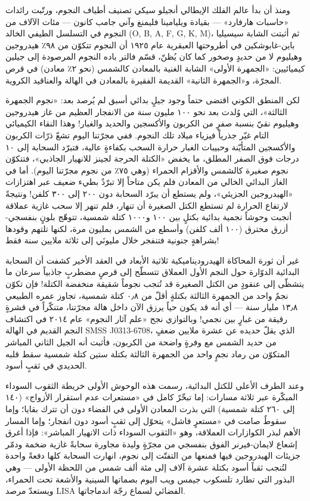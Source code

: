 \documentclass[12pt,a4paper,openany]{book}
\begin{document}
ومنذ أن بدأ عالم الفلك الإيطالي أنجيلو سيكي تصنيف أطياف النجوم، ورتّبت رائدات «حاسبات هارفارد» — بقيادة ويليامينا فليمنغ وآني جامب كانون — مئات الآلاف من النجوم في التسلسل الطيفي الخالد (O, B, A, F, G, K, M)، ثم أثبتت الشابة سيسيليا باين-غابوشكين في أطروحتها العبقرية عام ١٩٢٥ أن النجوم تتكوّن من ٩٨٪ هيدروجين وهيليوم لا من حديدٍ وصخور كما كان يُظنّ، قسّم فالتر باده النجوم المرصودة إلى جيلين كيميائيين: «الجمهرة الأولى» الشابة الغنية بالمعادن كالشمس (نحو ٢٪ معادن) في قرص المجرّة، و«الجمهرة الثانية» القديمة الفقيرة بالمعادن في الهالة والعناقيد الكروية.


لكن المنطق الكوني اقتضى حتماً وجود جيلٍ بدائي أسبق لم يُرصد بعد: «نجوم الجمهرة الثالثة»، التي وُلدت بعد نحو ١٠٠ مليون سنة من الانفجار العظيم من غاز هيدروجين وهيليوم نقيّ بنسبة صفرٍ من الكربون والأكسجين والحديد والغبار! وهذا النقاء الكيميائي التام غيّر جذرياً فيزياء ميلاد تلك النجوم. ففي مجرّتنا اليوم تشعّ ذرّات الكربون والأكسجين المتأيّنة وحبيبات الغبار حرارة السحب بكفاءةٍ عالية، فتبرّد السحابة إلى ١٠ درجات فوق الصفر المطلق، ما يخفض «الكتلة الحرجة لجينز للانهيار الجاذبي»، فتتكوّن نجوم صغيرة كالشمس والأقزام الحمراء (وهي ٧٥٪ من نجوم مجرّتنا اليوم). أما في الغاز البدائي الخالي من المعادن فلم يكن متاحاً إلا تبرّدٌ بطيء ضعيف عبر اهتزازات «الهيدروجين الجزيئي»، ولم يستطع أن يبرّد السحابة دون ٢٠٠ إلى ٣٠٠ كلفن! ونتيجةً لارتفاع الحرارة لم تستطع الكتل الصغيرة أن تنهار، فلم تنهر إلا سحب غازية عملاقة أنجبت وحوشاً نجمية بدائية بكتلٍ بين ١٠٠ و١٠٠٠ كتلة شمسية، تتوهّج بلونٍ بنفسجي-أزرق محترق (١٠٠ ألف كلفن) وأسطع من الشمس بمليون مرة، لكنها تلتهم وقودها بشراهةٍ جنونية فتنفجر خلال مليونَي إلى ثلاثة ملايين سنة فقط!


غير أن ثورة المحاكاة الهيدروديناميكية ثلاثية الأبعاد في العقد الأخير كشفت أن السحابة البدائية الدوّارة حول النجم الأول العملاق تتسطّح إلى قرصٍ مضطربٍ جاذبياً سرعان ما يتشظّى إلى عنقودٍ من الكتل الصغيرة قد تُنجب نجوماً شقيقة منخفضة الكتلة! فإن تكوّن نجمٌ واحد من الجمهرة الثالثة بكتلةٍ أقلّ من ٠٫٨ كتلة شمسية، تجاوز عمره الطبيعي ١٣٫٨ مليار سنة — أي أنه قد يكون حياً يرزق الآن داخل هالة مجرّتنا، متنكّراً في قشرةٍ رقيقة من غبارٍ بين نجمي! وبالتوازي نجح «علم آثار النجوم» عام ٢٠١٤ في اكتشاف النجم القديم في الهالة SMSS J0313-6708، الذي يقلّ حديده عن عشرة ملايين ضعفٍ من حديد الشمس مع وفرةٍ واضحة من الكربون، فأثبت أنه الجيل الثاني المباشر المتكوّن من رماد نجمٍ واحد من الجمهرة الثالثة بكتلة ستين كتلة شمسية سقط قلبه الحديدي في ثقبٍ أسود.


وعند الطرف الأعلى للكتل البدائية، رسمت هذه الوحوش الأولى خريطة الثقوب السوداء المبكّرة عبر ثلاثة مسارات: إما تبخّرٌ كامل في «مستعرات عدم استقرار الأزواج» (١٤٠ إلى ٢٦٠ كتلة شمسية) التي بذرت المعادن الأولى في الفضاء دون أن تترك بقايا؛ وإما سقوطٌ صامت في «مستعرٍ فاشل» يتحوّل إلى ثقبٍ أسود دون انفجار؛ وإما المسار الأهم لبذر الكوازارات العملاقة، وهو «الثقوب السوداء ذات الانهيار المباشر»: فإذا أغرق إشعاع لايمان-فيرنر الفوق بنفسجي من مجرّةٍ وليدة مجاورة سحابةً غازية ضخمة ودمّر جزيئات الهيدروجين فيها فمنعها من التفتّت إلى نجوم، انهارت السحابة كلها دفعةً واحدة لتُنجب ثقباً أسود بكتلة عشرة آلاف إلى مئة ألف شمس من اللحظة الأولى — وهي البذور التي تطارد تلسكوب جيمس ويب اليوم بصماتها السينية والأشعة تحت الحمراء، ويستعدّ مرصد LISA الفضائي لسماع رجّة اندماجاتها.
\end{document}
